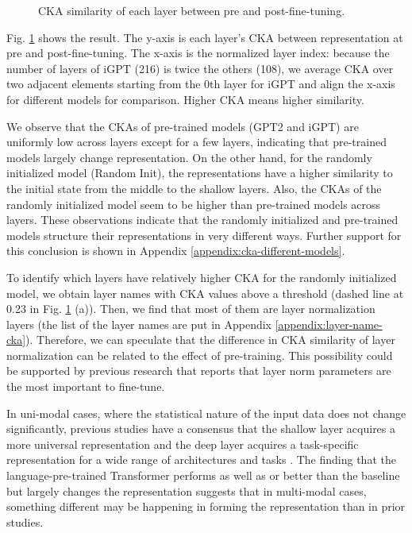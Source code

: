 \begin{figure}[h]
\begin{minipage}[b]{0.32\linewidth}
    \end{minipage}
    \caption{CKA similarity of each layer between pre and post-fine-tuning.}
    \label{fig:cka_plot_gpt2_dt}
\end{figure}

Fig. \ref{fig:cka_plot_gpt2_dt} shows the result. The y-axis is each layer's CKA between representation at pre and post-fine-tuning. The x-axis is the normalized layer index: because the number of layers of iGPT (216) is twice the others (108), we average CKA over two adjacent elements starting from the 0th layer for iGPT and align the x-axis for different models for comparison. Higher CKA means higher similarity.

We observe that the CKAs of pre-trained models (GPT2 and iGPT) are uniformly low across layers except for a few layers, indicating that pre-trained models largely change representation. On the other hand, for the randomly initialized model (Random Init), the representations have a higher similarity to the initial state from the middle to the shallow layers. Also, the CKAs of the randomly initialized model seem to be higher than pre-trained models across layers. These observations indicate that the randomly initialized and pre-trained models structure their representations in very different ways. Further support for this conclusion is shown in Appendix \ref{appendix:cka-different-models}.

To identify which layers have relatively higher CKA for the randomly initialized model, we obtain layer names with CKA values above a threshold (dashed line at 0.23 in Fig. \ref{fig:cka_plot_gpt2_dt} (a)). Then, we find that most of them are layer normalization layers (the list of the layer names are put in Appendix \ref{appendix:layer-name-cka}). Therefore, we can speculate that the difference in CKA similarity of layer normalization can be related to the effect of pre-training. This possibility could be supported by previous research \cite{lu2021pretrained} that reports that layer norm parameters are the most important to fine-tune.

In uni-modal cases, where the statistical nature of the input data does not change significantly, previous studies have a consensus that the shallow layer acquires a more universal representation and the deep layer acquires a task-specific representation for a wide range of architectures and tasks \cite{Raghu17,Morcos_nips18,Morcos_iclr18,Raghu19,voita-etal-2019-bottom,kornblith2019similarity,Merchant20,Neyshabur20,ramasesh2021anatomy}. The finding that the language-pre-trained Transformer performs as well as or better than the baseline but largely changes the representation suggests that in multi-modal cases, something different may be happening in forming the representation than in prior studies.


